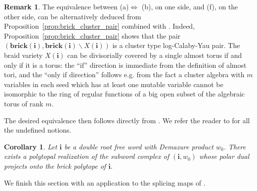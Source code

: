 \documentclass[a4paper, 11pt]{amsart}
\newcommand{\brick}{\mathbf{brick}}
\newcommand{\word}[1]{\mathbf{#1}}
\newtheorem{corollary}[theorem]{Corollary}%
\theoremstyle{definition}
\newtheorem{remark}[theorem]{Remark}
\begin{document}
\begin{remark}
\label{rem:brick_toric_alternative_proof}
The equivalence between (a)$\Longleftrightarrow$ (b), on one side, and (f), on the other side, can be alternatively deduced from Proposition~\ref{prop:brick_cluster_pair} combined with \cite{EFM}. Indeed, Proposition~\ref{prop:brick_cluster_pair} shows that the pair $(\brick(\word{i}), \brick(\word{i}) \backslash X(\word{i}))$ is a cluster type log-Calaby-Yau pair. The braid variety $X(\word{i})$ can be divisorially covered by a single almost torus if and only if it is a torus: the ``if'' direction is immediate from the definition of almost tori, and the ``only if direction'' follows e.g. from the fact a cluster algebra with $m$ variables in each seed which has at least one mutable variable cannot be isomorphic to the ring of regular functions of a big open subset of the algebraic torus of rank $m$. 

The desired equivalence then follows directly from \cite[Theorem 1.10]{EFM}. 
We refer the reader to \cite{EFM} for all the undefined notions.
\end{remark}


\begin{corollary}
\label{cor:polytope_projects_onto_brick}
Let $\word{i}$ be a double root free word with Demazure product $w_0$. There exists a polytopal realization of the subword complex of $(\word{i}, w_0)$ whose polar dual projects onto the brick polytope of  $\word{i}$. 
\end{corollary}

We finish this section with an application to the splicing maps of \cite{splicing2}.
\end{document}
